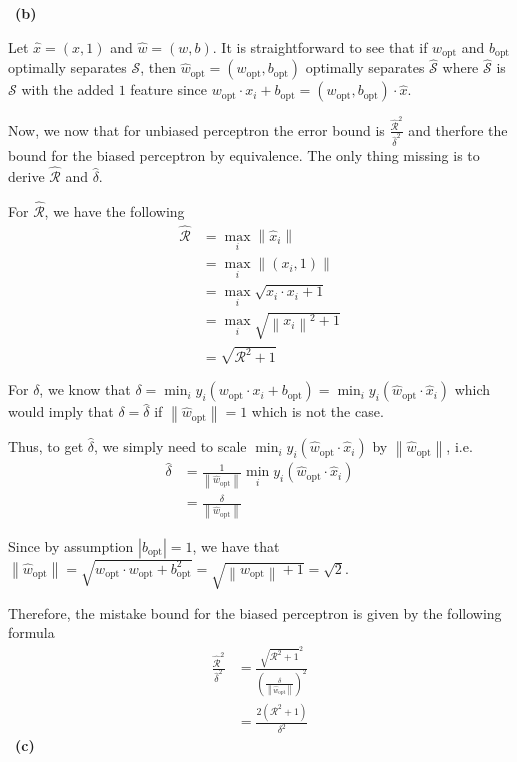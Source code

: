 \documentclass[a4 paper, 15pt]{article}
\newcommand{\norm}[1]{\left\lVert#1\right\rVert}
\numberwithin{equation}{section}
\newcommand{\subproblem}[1]{~\newline\textbf{(#1)}}
\begin{document}
\subproblem{b}

Let $\hat{x}= (x,1)$ and $\hat{w} = (w,b)$. It is straightforward to see that if  $w_{\text{opt}}$ and $b_{\text{opt}}$ optimally separates $\mathcal{S}$, then $ \hat{w}_{\text{opt}}=(w_{\text{opt}},b_{\text{opt}})$ optimally separates $\mathcal{\hat{S}}$ where $\mathcal{\hat{S}}$ is $\mathcal{S}$ with the added $1$ feature since $w_{\text{opt}}\cdot x_i + b_{\text{opt}}= (w_{\text{opt}},b_{\text{opt}}) \cdot \hat{x}$.

Now, we now that for unbiased perceptron the error bound is $\frac{\hat{\mathcal{R}}^2}{\hat{\delta}^2}$ and therfore the bound for the biased perceptron by equivalence. The only thing missing is to derive $\hat{\mathcal{R}}$ and $\hat{\delta}$.

For $\hat{\mathcal{R}}$, we have the following
\begin{align*}
  \hat{\mathcal{R}} & = \max_i \norm{\hat{x}_i}\\
   & = \max_i \norm{({x}_i,1)}\\
   & = \max_i \sqrt{x_i\cdot {x}_i + 1}\\
    & = \max_i \sqrt{\norm{x_i}^2 + 1}\\
      & = \sqrt{\mathcal{R}^2 + 1}
\end{align*}

For $\mathcal{\delta}$, we know that $\delta= \min_i y_i({w}_{\text{opt}}\cdot x_i + b_{\text{opt}}) = \min_i y_i(\hat{w}_{\text{opt}}\cdot \hat{x}_i)$ which would imply that $\delta =\hat{\delta}$ if $\norm{\hat{w}_{\text{opt}}}= 1 $ which is not the case.

Thus, to get $\hat{\delta}$, we simply need to scale $\min_i y_i(\hat{w}_{\text{opt}}\cdot \hat{x}_i)$ by $\norm{\hat{w}_{\text{opt}}}$, i.e.
\begin{align*}
  \hat{\delta} & = \frac{1}{\norm{\hat{w}_{\text{opt}}}}
  \min_i y_i(\hat{w}_{\text{opt}}\cdot \hat{x}_i)\\
   & = \frac{\delta}{\norm{\hat{w}_{\text{opt}}}}
\end{align*}

Since by assumption $|b_{\text{opt}}| = 1$, we have that $\norm{\hat{w}_{\text{opt}}} = \sqrt{{w}_{\text{opt}}\cdot {w}_{\text{opt}} + b_{\text{opt}}^2 } = \sqrt{\norm{{w}_{\text{opt}}} + 1} =\sqrt{2}$.

Therefore, the mistake bound for the biased perceptron is given by the following formula
\begin{align*}
  \frac{\hat{\mathcal{R}}^2}{\hat{\delta}^2} & = \frac{ \sqrt{\mathcal{R}^2 + 1}^2 }{\left(\frac{\delta}{\norm{\hat{w}_{\text{opt}}}}\right)^2}\\
  & = \frac{2(\mathcal{R}^2 + 1)}{\delta^2}
\end{align*}
\subproblem{c}
\end{document}
